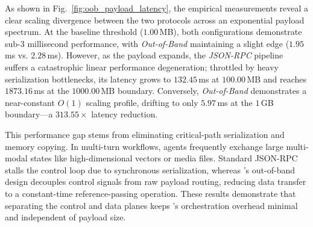 As shown in Fig.~\ref{fig:oob_payload_latency}, the empirical measurements reveal a clear scaling divergence between the two protocols across an exponential payload spectrum. At the baseline threshold ($1.00$\,MB), both configurations demonstrate sub-3 millisecond performance, with \textit{Out-of-Band} maintaining a slight edge ($1.95$\,ms vs. $2.28$\,ms). However, as the payload expands, the \textit{JSON-RPC} pipeline suffers a catastrophic linear performance degeneration; throttled by heavy serialization bottlenecks, its latency grows to $132.45$\,ms at $100.00$\,MB and reaches $1873.16$\,ms at the $1000.00$\,MB boundary. Conversely, \textit{Out-of-Band} demonstrates a near-constant $O(1)$ scaling profile, drifting to only $5.97$\,ms at the $1$\,GB boundary—a $313.55\times$ latency reduction.

This performance gap stems from eliminating critical-path serialization and memory copying. In multi-turn workflows, agents frequently exchange large multi-modal states like high-dimensional vectors or media files. Standard JSON-RPC stalls the control loop due to synchronous serialization, whereas \SystemName's out-of-band design decouples control signals from raw payload routing, reducing data transfer to a constant-time reference-passing operation. These results demonstrate that separating the control and data planes keeps \SystemName's orchestration overhead minimal and independent of payload size.